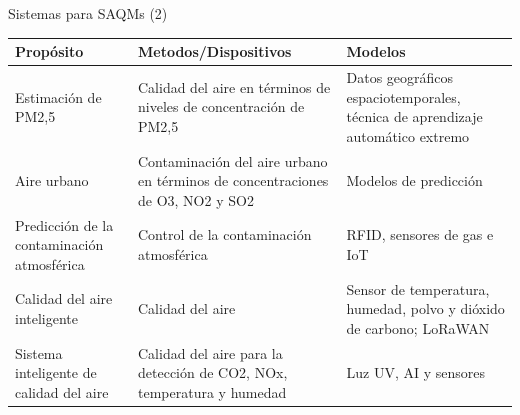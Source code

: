 \documentclass[aspectratio=169,compress]{beamer}
\begin{document}
\begin{frame}{Sistemas para SAQMs (2)}
\begin{center}
\footnotesize
\begin{tabular}{p{4.5cm}|p{4.5cm}|p{4.5cm}}
\hline
\textbf{Propósito} & \textbf{Metodos/Dispositivos} & \textbf{Modelos} \\
\hline

Estimación de PM2,5 &
Calidad del aire en términos de niveles de concentración de PM2,5 &
Datos geográficos espaciotemporales, técnica de aprendizaje automático extremo \\  \hline

Aire urbano & 
Contaminación del aire urbano en términos de concentraciones de O3, NO2 y SO2 &
Modelos de predicción \\  \hline

Predicción de la contaminación atmosférica &
Control de la contaminación atmosférica &
RFID, sensores de gas e IoT \\  \hline

Calidad del aire inteligente & 
Calidad del aire &
Sensor de temperatura, humedad, polvo y dióxido de carbono; LoRaWAN \\  \hline

Sistema inteligente de calidad del aire &
Calidad del aire para la detección de CO2, NOx, temperatura y humedad &
Luz UV, AI y sensores \\  \hline

\end{tabular}
\end{center}

\end{frame}
\end{document}

